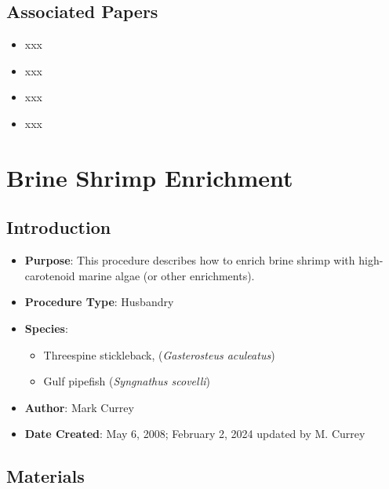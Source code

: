 \documentclass[
  letterpaper,
  DIV=11,
  numbers=noendperiod]{scrreprt}
\providecommand{\tightlist}{%
  \setlength{\itemsep}{0pt}\setlength{\parskip}{0pt}}\usepackage{longtable,booktabs,array}
\begin{document}
\hypertarget{associated-papers-17}{%
\section{Associated Papers}\label{associated-papers-17}}

\begin{itemize}
\tightlist
\item
  xxx
\item
  xxx
\item
  xxx
\item
  xxx
\end{itemize}

\hypertarget{sec-husbandry-enrich_brineshrimp}{%
\chapter{Brine Shrimp
Enrichment}\label{sec-husbandry-enrich_brineshrimp}}

\hypertarget{introduction-30}{%
\section{Introduction}\label{introduction-30}}

\begin{itemize}
\tightlist
\item
  \textbf{Purpose}: This procedure describes how to enrich brine shrimp
  with high-carotenoid marine algae (or other enrichments).
\item
  \textbf{Procedure Type}: Husbandry
\item
  \textbf{Species}:

  \begin{itemize}
  \tightlist
  \item
    Threespine stickleback, (\emph{Gasterosteus aculeatus})
  \item
    Gulf pipefish (\emph{Syngnathus scovelli})
  \end{itemize}
\item
  \textbf{Author}: Mark Currey
\item
  \textbf{Date Created}: May 6, 2008; February 2, 2024 updated by M.
  Currey
\end{itemize}

\hypertarget{materials-30}{%
\section{Materials}\label{materials-30}}
\end{document}
